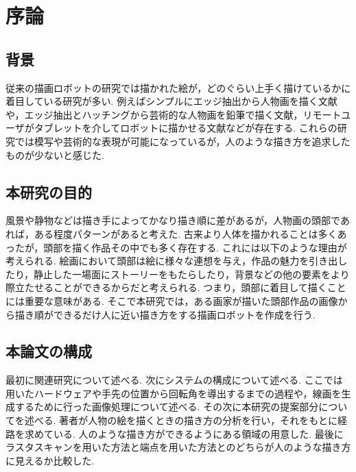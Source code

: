 \chapter{序論}
  \label{chap:intro}
  \section{背景}
    \label{sec:background}
	従来の描画ロボットの研究では描かれた絵が，どのぐらい上手く描けているかに着目している研究が多い. 
	例えばシンプルにエッジ抽出から人物画を描く文献\cite{1}や，エッジ抽出とハッチングから芸術的な人物画を鉛筆で描く文献\cite{2}，リモートユーザがタブレットを介してロボットに描かせる文献\cite{3}などが存在する. 
	これらの研究では模写や芸術的な表現が可能になっているが，人のような描き方を追求したものが少ないと感じた.
  \section{本研究の目的}
    \label{sec:target}
	風景や静物などは描き手によってかなり描き順に差があるが，人物画の頭部であれば，ある程度パターンがあると考えた. 
	古来より人体を描かれることは多くあったが，頭部を描く作品その中でも多く存在する. これには以下のような理由が考えられる. 
	絵画において頭部は絵に様々な連想を与え，作品の魅力を引き出したり，静止した一場面にストーリーをもたらしたり，背景などの他の要素をより際立たせることができるからだと考えられる. 
	つまり，頭部に着目して描くことには重要な意味がある.	そこで本研究では，ある画家が描いた頭部作品の画像から描き順ができるだけ人に近い描き方をする描画ロボットを作成を行う.\\
	

	\section{本論文の構成}
    \label{sec:construction_of_this_paper}
	最初に関連研究について述べる. 次にシステムの構成について述べる. ここでは用いたハードウェアや手先の位置から回転角を導出するまでの過程や，線画を生成するために行った画像処理について述べる. 
	その次に本研究の提案部分についてを述べる. 著者が人物の絵を描くときの描き方の分析を行い，それをもとに経路を求めている. 人のような描き方ができるようにある領域の用意した.  最後にラスタスキャンを用いた方法と端点を用いた方法とのどちらが人のような描き方に見えるか比較した.
    
